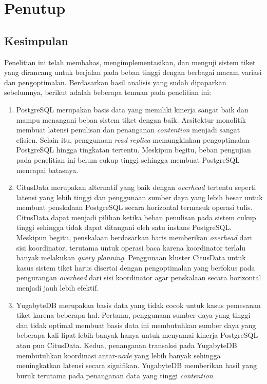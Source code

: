 \chapter{Penutup}

\section{Kesimpulan}

Penelitian ini telah membahas, mengimplementasikan, dan menguji sistem tiket yang dirancang untuk berjalan pada beban tinggi dengan berbagai macam variasi dan pengoptimalan. Berdasarkan hasil analisis yang sudah dipaparkan sebelumnya, berikut adalah beberapa temuan pada penelitian ini:

\begin{enumerate}
    \item PostgreSQL merupakan basis data yang memiliki kinerja sangat baik dan mampu menangani beban sistem tiket dengan baik. Arsitektur monolitik membuat latensi penulisan dan penanganan \textit{contention} menjadi sangat efisien. Selain itu, penggunaan \textit{read replica} memungkinkan pengoptimalan PostgreSQL hingga tingkatan tertentu. Meskipun begitu, beban pengujian pada penelitian ini belum cukup tinggi sehingga membuat PostgreSQL mencapai batasnya.
    \item CitusData merupakan alternatif yang baik dengan \textit{overhead} tertentu seperti latensi yang lebih tinggi dan penggunaan sumber daya yang lebih besar untuk membuat penskalaan PostgreSQL secara horizontal termasuk operasi tulis. CitusData dapat menjadi pilihan ketika beban penulisan pada sistem cukup tinggi sehingga tidak dapat ditangani oleh satu instans PostgreSQL. Meskipun begitu, penskalaan berdasarkan baris memberikan \textit{overhead} dari sisi koordinator, terutama untuk operasi baca karena koordinator terlalu banyak melakukan \textit{query planning}. Penggunaan kluster CitusData untuk kasus sistem tiket harus disertai dengan pengoptimalan yang berfokus pada pengurangan \textit{overhead} dari sisi koordinator agar penskalaan secara horizontal menjadi jauh lebih efektif.
    \item YugabyteDB merupakan basis data yang tidak cocok untuk kasus pemesanan tiket karena beberapa hal. Pertama, penggunaan sumber daya yang tinggi dan tidak optimal membuat basis data ini membutuhkan sumber daya yang beberapa kali lipat lebih banyak hanya untuk menyamai kinerja PostgreSQL atau pun CitusData. Kedua, penanganan transaksi pada YugabyteDB membutuhkan koordinasi antar-\textit{node} yang lebih banyak sehingga meningkatkan latensi secara signifikan. YugabyteDB memberikan hasil yang buruk terutama pada penanganan data yang tinggi \textit{contention}.

\end{enumerate}
